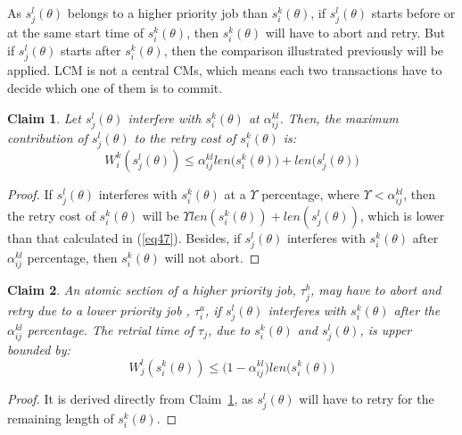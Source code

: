 \documentclass[conference]{IEEEtran}
\newtheorem{clm}{Claim}
\begin{document}
As $s_{j}^{l}(\theta)$ belongs to a higher priority job than $s_{i}^{k}(\theta)$, if $s_{j}^{l}(\theta)$ starts before or at the same start time of
$s_{i}^{k}(\theta)$, then $s_{i}^{k}(\theta)$ will have to abort
and retry. But if $s_{j}^{l}(\theta)$
starts after $s_{i}^{k}(\theta)$, then the comparison illustrated
previously will be applied. LCM is not a central CMs, which means each two transactions have to decide which one of them is to commit.

\begin{clm}
\label{LCM_higher_rc}
Let $s_{j}^{l}(\theta)$ interfere with $s_{i}^{k}(\theta)$ at $\alpha_{ij}^{kl}$. Then, the maximum contribution of $s_{j}^{l}(\theta)$ to the retry cost of $s_{i}^{k}(\theta)$ is:
\begin{equation}
W_i^k(s_j^l(\theta))\le \alpha_{ij}^{kl}len\Big(s_{i}^{k}(\theta)\Big)+len\Big(s_{j}^{l}(\theta)\Big)\label{eq47}\end{equation}
\end{clm}
\begin{proof}
If $s_{j}^{l}(\theta)$ interferes with $s_{i}^{k}(\theta)$
at a $\Upsilon$ percentage, where $\Upsilon<\alpha_{ij}^{kl}$,
then the retry cost of $s_{i}^{k}(\theta)$ will be $\Upsilon len(s_{i}^{k}(\theta))+len(s_{j}^{l}(\theta))$, which is lower than that calculated in (\ref{eq47}). Besides, 
if $s_{j}^{l}(\theta)$ interferes with $s_{i}^{k}(\theta)$ after
$\alpha_{ij}^{kl}$ percentage, then $s_{i}^{k}(\theta)$ will not
abort.
\end{proof}

\begin{clm}
\label{LCM_lower_rc}
An atomic section of a higher priority job, $\tau_{j}^b$, may have to abort and retry due to a lower priority job	, $\tau_{i}^a$, if $s_{j}^{l}(\theta)$ interferes
with $s_{i}^{k}(\theta)$ after the $\alpha_{ij}^{kl}$ percentage.
The retrial time of $\tau_{j}$, due to $s_{i}^{k}(\theta)$ and $s_{j}^{l}(\theta)$,
is upper bounded by:
 \begin{equation}
W_j^l(s_i^k(\theta))\le \Big(1-\alpha_{ij}^{kl}\Big)len\Big(s_{i}^{k}(\theta)\Big)\label{eq48}\end{equation}
\end{clm}
\begin{proof}
It is derived directly from Claim~\ref{LCM_higher_rc}, as $s_j^l(\theta)$ will have to retry for the remaining length of $s_i^k(\theta)$.
\end{proof}
\end{document}
